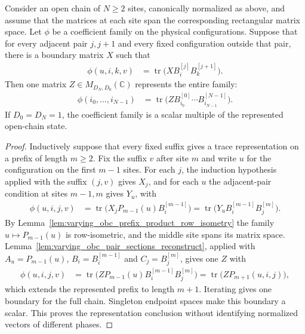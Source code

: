 \begin{lemma}
    \label{lem:varying_obc_full_chain_reconstruction}
    \leanok
    Consider an open chain of $N\ge2$ sites, canonically normalized as above,
    and assume that the matrices at each site span the corresponding
    rectangular matrix space. Let $\phi$ be a coefficient family on the
    physical configurations. Suppose that for every adjacent pair $j,j+1$
    and every fixed configuration outside that pair, there is a boundary
    matrix $X$ such that
    \begin{align}
        \phi(u,i,k,v) & =\operatorname{tr}
        \bigl(X B^{[j]}_i B^{[j+1]}_k\bigr).
    \end{align}
    Then one matrix $Z\in M_{D_N,D_0}(\mathbb C)$ represents the entire family:
    \begin{align}
        \phi(i_0,\ldots,i_{N-1}) & =\operatorname{tr}
        \bigl(Z B^{[0]}_{i_0}\cdots B^{[N-1]}_{i_{N-1}}\bigr).
    \end{align}
    If $D_0=D_N=1$, the coefficient family is a scalar multiple of the
    represented open-chain state.
\end{lemma}
\begin{proof}\leanok
    Inductively suppose that every fixed suffix gives a trace representation
    on a prefix of length $m\ge2$. Fix the suffix $v$ after site $m$ and
    write $u$ for the configuration on the first $m-1$ sites. For each $j$,
    the induction hypothesis applied with the suffix $(j,v)$ gives $X_j$, and
    for each $u$ the adjacent-pair condition at sites $m-1,m$ gives $Y_u$, with
    \begin{align}
        \phi(u,i,j,v)
         & =\operatorname{tr}\bigl(X_jP_{m-1}(u)B^{[m-1]}_i\bigr)
        =\operatorname{tr}\bigl(Y_uB^{[m-1]}_iB^{[m]}_j\bigr).
        \label{eq:varying_obc_full_chain_sections}
    \end{align}
    By Lemma~\ref{lem:varying_obc_prefix_product_row_isometry} the family
    $u\mapsto P_{m-1}(u)$ is row-isometric, and the middle site spans its
    matrix space. Lemma~\ref{lem:varying_obc_pair_sections_reconstruct},
    applied with $A_u=P_{m-1}(u)$, $B_i=B^{[m-1]}_i$ and $C_j=B^{[m]}_j$,
    gives one $Z$ with
    \begin{align}
        \phi(u,i,j,v)
         & =\operatorname{tr}\bigl(ZP_{m-1}(u)B^{[m-1]}_iB^{[m]}_j\bigr)
        =\operatorname{tr}\bigl(ZP_{m+1}(u,i,j)\bigr),
        \label{eq:varying_obc_full_chain_extension}
    \end{align}
    which extends the represented prefix to length $m+1$. Iterating gives
    one boundary for the full chain. Singleton endpoint spaces make this
    boundary a scalar. This proves the representation conclusion without
    identifying normalized vectors of different phases.
\end{proof}

